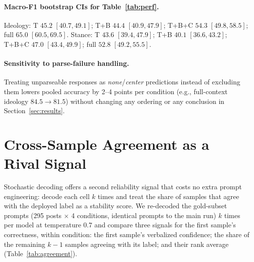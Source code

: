 \documentclass[11pt]{article}
\begin{document}
\paragraph{Macro-F1 bootstrap CIs for Table~\ref{tab:perf}.}
Ideology: T $45.2$ $[40.7, 49.1]$; T+B $44.4$ $[40.9, 47.9]$; T+B+C $54.3$ $[49.8, 58.5]$; full $65.0$ $[60.5, 69.5]$.
Stance: T $43.6$ $[39.4, 47.9]$; T+B $40.1$ $[36.6, 43.2]$; T+B+C $47.0$ $[43.4, 49.9]$; full $52.8$ $[49.2, 55.5]$.

\paragraph{Sensitivity to parse-failure handling.}
Treating unparseable responses as \emph{none}/\emph{center} predictions instead of excluding them lowers pooled accuracy by 2--4 points per condition (e.g., full-context ideology $84.5 \rightarrow 81.5$) without changing any ordering or any conclusion in Section~\ref{sec:results}.

\section{Cross-Sample Agreement as a Rival Signal}
\label{app:agreement}

Stochastic decoding offers a second reliability signal that costs no extra prompt engineering: decode each cell $k$ times and treat the share of samples that agree with the deployed label as a stability score. We re-decoded the gold-subset prompts (295 posts $\times$ 4 conditions, identical prompts to the main run) $k$ times per model at temperature $0.7$ and compare three signals for the first sample's correctness, within condition: the first sample's verbalized confidence; the share of the remaining $k{-}1$ samples agreeing with its label; and their rank average (Table~\ref{tab:agreement}).
\end{document}
